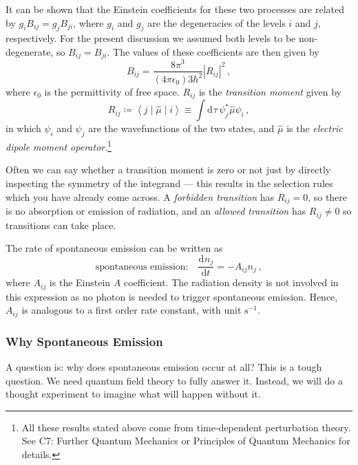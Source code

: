 \documentclass{article}
\theoremstyle{plain}\theoremheaderfont{\normalfont\itshape}\theorembodyfont{\rmfamily}\theoremseparator{.}\newtheorem*{rem}{Remark}\newtheorem*{ex}{Example}\newtheorem*{proof}{Proof}\newtheorem*{altp}{Alternative proof}
\theoremstyle{plain}\theoremheaderfont{\normalfont\bfseries}\theorembodyfont{\rmfamily}\theoremseparator{.}\newtheorem{thm}{Theorem}[section]\newtheorem{lem}[thm]{Lemma}\newtheorem{prop}[thm]{Proposition}\newtheorem*{cor}{Corollary}\newtheorem{defn}[thm]{Definition}\newtheorem{clm}[thm]{Claim}\newtheorem{clminproof}{Claim}\newtheorem{pos}{Postulate}[section]
\theoremstyle{break}\theoremheaderfont{\normalfont\itshape}\theorembodyfont{\rmfamily}\theoremseparator{.\medskip}\newtheorem*{proofskip}{Proof}\newtheorem*{exs}{Examples}\newtheorem*{rems}{Remarks}
\theoremstyle{break}\theoremheaderfont{\normalfont\bfseries}\theorembodyfont{\rmfamily}\theoremseparator{.\medskip}\newtheorem{lemskip}[thm]{Lemma}\newtheorem{defnskip}[thm]{Definition}\newtheorem{propskip}[thm]{Proposition}\newtheorem{thmskip}[thm]{Theorem}
\numberwithin{equation}{section}
\newcommand{\dd}[2][]{\mathrm{d}^{#1} #2\,}
\newcommand{\dv}[3][]{\frac{\mathrm{d}^{#1} #2}{{\mathrm{d} #3}^{#1}}}
\newcommand{\mel}[3]{\left\langle #1 \middle| #2 \middle| #3 \right\rangle}
\newcommand{\abs}[1]{\left| #1 \right|}
\begin{document}
    It can be shown that the Einstein coefficients for these two processes are related by \(g_i B_{ij}=g_j B_{ji}\), where \(g_i\) and \(g_j\) are the degeneracies of the levels \(i\) and \(j\), respectively. For the present discussion we assumed both levels to be non-degenerate, so \(B_{ij}=B_{ji}\). The values of these coefficients are then given by
    \begin{equation}
        B_{ij}=\frac{8 \pi^3}{(4\pi\epsilon_0) 3 h^2} \abs{R_{ij}}^2\,,
    \end{equation}
    where \(\epsilon_0\) is the permittivity of free space. \(R_{ij}\) is the \textit{transition moment} given by
    \begin{equation}
        R_{ij} \coloneqq \mel{j}{\hat{\mu}}{i} \equiv \int\dd{\tau} \psi_j^* \hat{\mu} \psi_i\,,
    \end{equation}
    in which \(\psi_i\) and \(\psi_j\) are the wavefunctions of the two states, and \(\hat{\mu}\) is the \textit{electric dipole moment operator}.\footnote{All these results stated above come from time-dependent perturbation theory. See C7: Further Quantum Mechanics or Principles of Quantum Mechanics for details.}

    Often we can say whether a transition moment is zero or not just by directly inspecting the symmetry of the integrand --- this results in the selection rules which you have already come across. A \textit{forbidden transition} has \(R_{ij}=0\), so there is no absorption or emission of radiation, and an \textit{allowed transition} has \(R_{ij}\ne 0\) so transitions can take place.

    The rate of spontaneous emission can be written as
    \begin{equation}\label{spontaneous_emission}
        \text{spontaneous emission:}\quad \dv{n_j}{t}=-A_{ij} n_j\,,
    \end{equation}
    where \(A_{ij}\) is the Einstein \(A\) coefficient. The radiation density is not involved in this expression as no photon is needed to trigger spontaneous emission. Hence, \(A_{ij}\) is analogous to a first order rate constant, with unit \(\mathrm{s}^{-1}\).

    \subsubsection{Why Spontaneous Emission}
    A question is: why does spontaneous emission occur at all? This is a tough question. We need quantum field theory to fully answer it. Instead, we will do a thought experiment to imagine what will happen without it.
\end{document}
